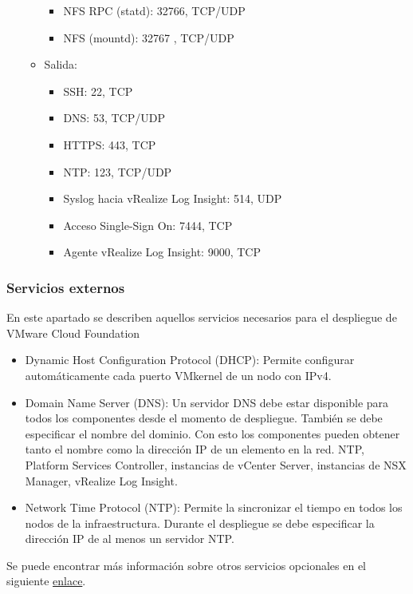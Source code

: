 \begin{itemize}
\begin{itemize}
\begin{itemize}
                \item NFS RPC (statd): 32766, TCP/UDP
                \item NFS (mountd): 32767 , TCP/UDP
            \end{itemize}
        \item Salida:
            \begin{itemize}
                \item SSH: 22, TCP
                \item DNS: 53, TCP/UDP
                \item HTTPS: 443, TCP
                \item NTP: 123, TCP/UDP
                \item Syslog hacia vRealize Log Insight: 514, UDP
                \item Acceso Single-Sign On: 7444, TCP
                \item Agente vRealize Log Insight: 9000, TCP
            \end{itemize}
    \end{itemize}
\end{itemize}
\fi

\FloatBarrier

\subsubsection{Servicios externos}
\label{subsubsec:servExterno}
En este apartado se describen aquellos servicios necesarios para el despliegue de VMware Cloud Foundation
\begin{itemize}
    \item Dynamic Host Configuration Protocol (DHCP): Permite configurar automáticamente cada puerto VMkernel de un nodo con IPv4. 
    \item Domain Name Server (DNS): Un servidor DNS debe estar disponible para todos los componentes desde el momento de despliegue. También se debe especificar el nombre del dominio. Con esto los componentes pueden obtener tanto el nombre como la dirección IP de un elemento en la red. NTP, Platform Services Controller, instancias de vCenter Server, instancias de NSX Manager, vRealize Log Insight.
    \item Network Time Protocol (NTP): Permite la sincronizar el tiempo en todos los nodos de la infraestructura. Durante el despliegue se debe especificar la dirección IP de al menos un servidor NTP.
\end{itemize}
Se puede encontrar más información sobre otros servicios opcionales en el siguiente \href{https://docs.vmware.com/en/VMware-Cloud-Foundation/3.9/com.vmware.vcf.planprep.doc_39/GUID-F022BD3C-F11C-4EE6-83EA-ABE016E7A9B9.htm}{enlace}.
\FloatBarrier


